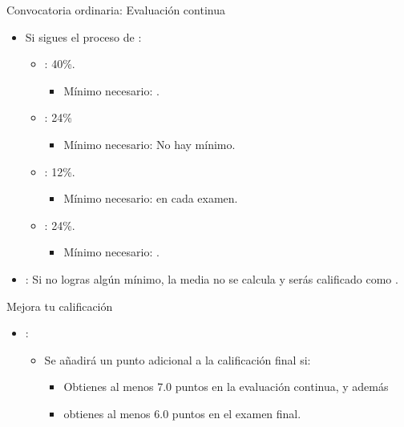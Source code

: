 \begin{frame}[t]{Convocatoria ordinaria: Evaluación continua}
\begin{itemize}
  \item Si sigues el proceso de :
    \begin{itemize}
    \item {}: 40\%.
      \begin{itemize}
        \item Mínimo necesario: .
      \end{itemize}
    \item {}: 24\%
      \begin{itemize}
        \item Mínimo necesario: \alert{No hay mínimo}.
      \end{itemize}
    \item {}: 12\%.
      \begin{itemize}
        \item Mínimo necesario:  en cada examen.
      \end{itemize}
    \item {}: 24\%.
      \begin{itemize}
        \item Mínimo necesario: .
      \end{itemize}
  \end{itemize}

  \item {}: Si no logras algún mínimo, 
        la media no se calcula y serás calificado como .
\end{itemize}
\end{frame}

\begin{frame}[t]{Mejora tu calificación}
\begin{itemize}
  \item {}:
    \begin{itemize}
      \item Se añadirá un punto adicional a la calificación final si:
        \begin{itemize}
          \item Obtienes al menos 7.0 puntos en la evaluación continua, y además
          \item obtienes al menos 6.0 puntos en el examen final.
        \end{itemize}
    \end{itemize}
\end{itemize}
\end{frame}

